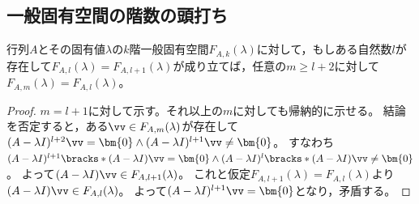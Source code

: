         \subsection{一般固有空間の階数の頭打ち}
            \begin{shadebox}
                行列$A$とその固有値$\lambda$の$k$階一般固有空間$F_{A,k}(\lambda)$に対して，もしある自然数$l$が存在して$F_{A,l}(\lambda)=F_{A,l+1}(\lambda)$が成り立てば，任意の$m\geq l+2$に対して$F_{A,m}(\lambda)=F_{A,l}(\lambda)$。
            \end{shadebox}
            \begin{proof}
                $m=l+1$に対して示す。それ以上の$m$に対しても帰納的に示せる。
                結論を否定すると，ある$\vv\in F_{A,m}(\lambda)$が存在して$(A-\lambda I)^{l+2}\vv=\bm{0}\land(A-\lambda I)^{l+1}\vv\neq\bm{0}$。
                すなわち$(A-\lambda I)^{l+1}\bracks*{(A-\lambda I)\vv}=\bm{0}\land(A-\lambda I)^l\bracks*{(A-\lambda I)\vv}\neq\bm{0}$。
                よって$(A-\lambda I)\vv \in F_{A,l+1}(\lambda)$。
                これと仮定$F_{A,l+1}(\lambda) = F_{A,l}(\lambda)$より$(A-\lambda I)\vv \in F_{A,l}(\lambda)$。
                よって$(A-\lambda I)^{l+1}\vv=\bm{0}$となり，矛盾する。
            \end{proof}
